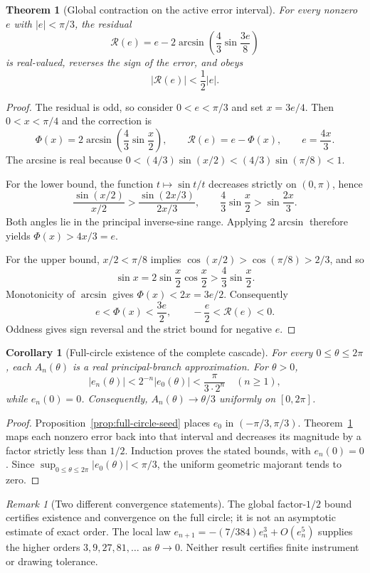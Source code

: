\documentclass[11pt]{article}
\newtheorem{theorem}{Theorem}
\newtheorem{corollary}{Corollary}
\theoremstyle{remark}
\newtheorem{remark}{Remark}
\newcommand{\Rop}{\mathscr{R}}
\begin{document}
\begin{theorem}[Global contraction on the active error interval]
\label{thm:global-contraction}
For every nonzero $e$ with $|e|<\pi/3$, the residual
\[
\Rop(e)=e-2\arcsin\!\left(\frac43\sin\frac{3e}{8}\right)
\]
is real-valued, reverses the sign of the error, and obeys
\[
\boxed{\quad |\Rop(e)|<\frac12|e|.\quad}
\]
\end{theorem}
\begin{proof}
The residual is odd, so consider $0<e<\pi/3$ and set $x=3e/4$.
Then $0<x<\pi/4$ and the correction is
\[
\Phi(x)=2\arcsin\!\left(\frac43\sin\frac{x}{2}\right),
\qquad \Rop(e)=e-\Phi(x),\qquad e=\frac{4x}{3}.
\]
The arcsine is real because
$0<(4/3)\sin(x/2)<(4/3)\sin(\pi/8)<1$.

For the lower bound, the function $t\mapsto\sin t/t$ decreases
strictly on $(0,\pi)$, hence
\[
\frac{\sin(x/2)}{x/2}>
\frac{\sin(2x/3)}{2x/3},\qquad
\frac43\sin\frac{x}{2}>\sin\frac{2x}{3}.
\]
Both angles lie in the principal inverse-sine range. Applying
$2\arcsin$ therefore yields $\Phi(x)>4x/3=e$.

For the upper bound, $x/2<\pi/8$ implies
$\cos(x/2)>\cos(\pi/8)>2/3$, and so
\[
\sin x=2\sin\frac{x}{2}\cos\frac{x}{2}>
\frac43\sin\frac{x}{2}.
\]
Monotonicity of $\arcsin$ gives $\Phi(x)<2x=3e/2$.
Consequently
\[
e<\Phi(x)<\frac{3e}{2},\qquad
-\frac e2<\Rop(e)<0.
\]
Oddness gives sign reversal and the strict bound for negative $e$.
\end{proof}

\begin{corollary}[Full-circle existence of the complete cascade]
\label{cor:full-circle}
For every $0\le\theta\le2\pi$, each $A_n(\theta)$ is a real
principal-branch approximation. For $\theta>0$,
\[
|e_n(\theta)|<2^{-n}|e_0(\theta)|<\frac{\pi}{3\cdot2^n}
\quad(n\ge1),
\]
while $e_n(0)=0$. Consequently, $A_n(\theta)\to\theta/3$
uniformly on $[0,2\pi]$.
\end{corollary}
\begin{proof}
Proposition~\ref{prop:full-circle-seed} places $e_0$ in
$(-\pi/3,\pi/3)$. Theorem~\ref{thm:global-contraction} maps each
nonzero error back into that interval and decreases its magnitude by a
factor strictly less than $1/2$. Induction proves the stated bounds,
with $e_n(0)=0$. Since $\sup_{0\le\theta\le2\pi}|e_0(\theta)|<\pi/3$,
the uniform geometric majorant tends to zero.
\end{proof}

\begin{remark}[Two different convergence statements]
The global factor-$1/2$ bound certifies existence and convergence on the
full circle; it is not an asymptotic estimate of exact order. The local
law $e_{n+1}=-(7/384)e_n^3+O(e_n^5)$ supplies the higher orders
$3,9,27,81,\ldots$ as $\theta\to0$. Neither result certifies finite
instrument or drawing tolerance.
\end{remark}
\end{document}
